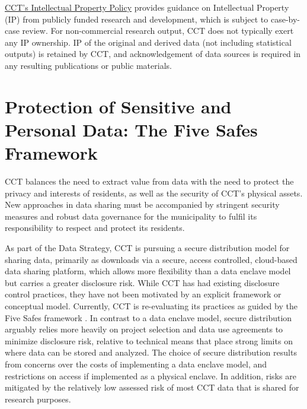 \href{https://resource.capetown.gov.za/documentcentre/Documents/Bylaws\%20and\%20policies/Intellectual_Property_Policy.pdf}{CCT's Intellectual Property Policy} provides guidance on Intellectual Property (IP) from publicly funded research and development, which is subject to case-by-case review. For non-commercial research output, CCT does not typically exert any IP ownership. IP of the original and derived data (not including statistical outputs) is retained by CCT, and acknowledgement of data sources is required in any resulting publications or public materials.

\hypertarget{protection-of-sensitive-and-personal-data-the-five-safes-framework-5}{%
\section{Protection of Sensitive and Personal Data: The Five Safes Framework}\label{protection-of-sensitive-and-personal-data-the-five-safes-framework-5}}

CCT balances the need to extract value from data with the need to protect the privacy and interests of residents, as well as the security of CCT's physical assets. New approaches in data sharing must be accompanied by stringent security measures and robust data governance for the municipality to fulfil its responsibility to respect and protect its residents.

As part of the Data Strategy, CCT is pursuing a secure distribution model for sharing data, primarily as downloads via a secure, access controlled, cloud-based data sharing platform, which allows more flexibility than a data enclave model but carries a greater disclosure risk. While CCT has had existing disclosure control practices, they have not been motivated by an explicit framework or conceptual model. Currently, CCT is re-evaluating its practices as guided by the Five Safes framework \citep{desai2016}. In contrast to a data enclave model, secure distribution arguably relies more heavily on project selection and data use agreements to minimize disclosure risk, relative to technical means that place strong limits on where data can be stored and analyzed. The choice of secure distribution results from concerns over the costs of implementing a data enclave model, and restrictions on access if implemented as a physical enclave. In addition, risks are mitigated by the relatively low assessed risk of most CCT data that is shared for research purposes.

